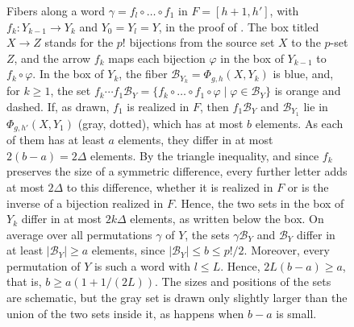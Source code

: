 \documentclass[fontsize=12pt,leading=14pt]{fullpaper}
\newcommand{\Bcal}{\mathcal{B}}
\begin{document}
\begin{figure}[ht]
  \caption{Fibers along a word $\gamma=f_l\circ\dots\circ f_1$ in $F=[h+1,h']$, with $f_k\colon Y_{k-1}\to Y_k$ and $Y_0=Y_l=Y$, in the proof of .
    The box titled $X\to Z$ stands for the $p!$ bijections from the source set $X$ to the $p$-set $Z$, and the arrow $f_k$ maps each bijection $\varphi$ in the box of $Y_{k-1}$ to $f_k\circ\varphi$.
    In the box of $Y_k$, the fiber $\Bcal_{Y_k}=\Phi_{g,h}(X,Y_k)$ is blue, and, for $k\ge1$, the set $f_k\cdots f_1\Bcal_Y=\{f_k\circ\dots\circ f_1\circ\varphi\mid\varphi\in\Bcal_Y\}$ is orange and dashed.
    If, as drawn, $f_1$ is realized in $F$, then $f_1\Bcal_Y$ and $\Bcal_{Y_1}$ lie in $\Phi_{g,h'}(X,Y_1)$ (gray, dotted), which has at most $b$ elements.
    As each of them has at least $a$ elements, they differ in at most $2(b-a)=2\Delta$ elements.
    By the triangle inequality, and since $f_k$ preserves the size of a symmetric difference, every further letter adds at most $2\Delta$ to this difference, whether it is realized in $F$ or is the inverse of a bijection realized in $F$.
    Hence, the two sets in the box of $Y_k$ differ in at most $2k\Delta$ elements, as written below the box.
    On average over all permutations $\gamma$ of $Y$, the sets $\gamma\Bcal_Y$ and $\Bcal_Y$ differ in at least $|\Bcal_Y|\ge a$ elements, since $|\Bcal_Y|\le b\le p!/2$.
    Moreover, every permutation of $Y$ is such a word with $l\le L$.
    Hence, $2L(b-a)\ge a$, that is, $b\ge a(1+1/(2L))$.
  The sizes and positions of the sets are schematic, but the gray set is drawn only slightly larger than the union of the two sets inside it, as happens when $b-a$ is small.}
  \label{fig:s3-growth}
\end{figure}
\end{document}

